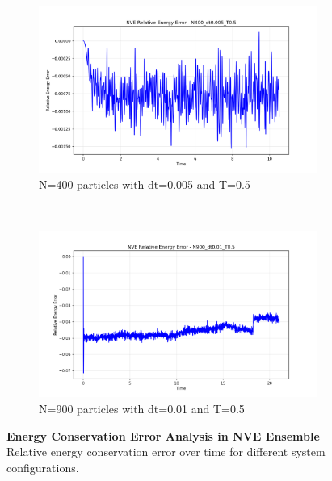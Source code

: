\begin{figure}[H]
\begin{subfigure}{0.5\textwidth}
		\includegraphics[width=\textwidth]{media/error_N400_dt0.005_T0.5.png}
		\caption{N=400 particles with dt=0.005 and T=0.5}
		\label{sfig:error_N400_dt0005}
	\end{subfigure}%
	~
\begin{subfigure}{0.5\textwidth}
		\includegraphics[width=\textwidth]{media/error_N900_dt0.01_T0.5.png}
		\caption{N=900 particles with dt=0.01 and T=0.5}
		\label{sfig:error_N900}
	\end{subfigure}%

	\caption{\textbf{Energy Conservation Error Analysis in NVE Ensemble} 
	Relative energy conservation error over time for different system configurations.}
	\label{fig:energy_error}
\end{figure}
